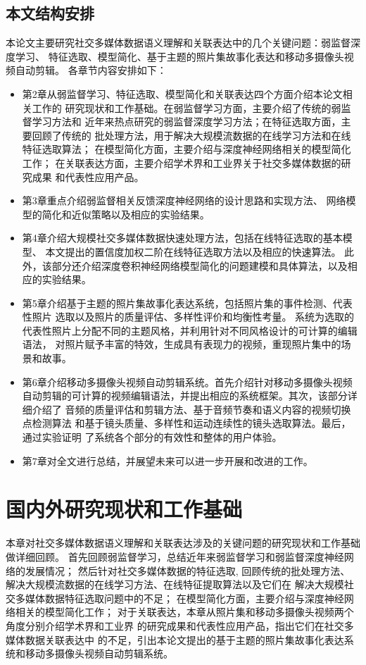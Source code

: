 \documentclass[doctor]{ustcthesis}
\begin{document}
\section{本文结构安排}
本论文主要研究社交多媒体数据语义理解和关联表达中的几个关键问题：弱监督深度学习、
特征选取、模型简化、基于主题的照片集故事化表达和移动多摄像头视频自动剪辑。
各章节内容安排如下：
\begin{itemize}
    \item 第2章从弱监督学习、特征选取、模型简化和关联表达四个方面介绍本论文相关工作的
        研究现状和工作基础。在弱监督学习方面，主要介绍了传统的弱监督学习方法和
        近年来热点研究的弱监督深度学习方法；在特征选取方面，主要回顾了传统的
        批处理方法，用于解决大规模流数据的在线学习方法和在线特征选取算法；
        在模型简化方面，主要介绍与深度神经网络相关的模型简化工作；
        在关联表达方面，主要介绍学术界和工业界关于社交多媒体数据的研究成果
        和代表性应用产品。
    \item 第3章重点介绍弱监督相关反馈深度神经网络的设计思路和实现方法、
        网络模型的简化和近似策略以及相应的实验结果。
    \item 第4章介绍大规模社交多媒体数据快速处理方法，包括在线特征选取的基本模型、
        本文提出的置信度加权二阶在线特征选取方法以及相应的快速算法。
        此外，该部分还介绍深度卷积神经网络模型简化的问题建模和具体算法，以及相应的实验结果。
    \item 第5章介绍基于主题的照片集故事化表达系统，包括照片集的事件检测、代表性照片
        选取以及照片的质量评估、多样性评价和均衡性考量。
        系统为选取的代表性照片上分配不同的主题风格，并利用针对不同风格设计的可计算的编辑语法，
        对照片赋予丰富的特效，生成具有表现力的视频，重现照片集中的场景和故事。
    \item 第6章介绍移动多摄像头视频自动剪辑系统。首先介绍针对移动多摄像头视频
        自动剪辑的可计算的视频编辑语法，并提出相应的系统框架。其次，该部分详细介绍了
        音频的质量评估和剪辑方法、基于音频节奏和语义内容的视频切换点检测算法
        和基于镜头质量、多样性和运动连续性的镜头选取算法。最后，通过实验证明
        了系统各个部分的有效性和整体的用户体验。
    \item 第7章对全文进行总结，并展望未来可以进一步开展和改进的工作。
\end{itemize}


\chapter{国内外研究现状和工作基础}
本章对社交多媒体数据语义理解和关联表达涉及的关键问题的研究现状和工作基础做详细回顾。
首先回顾弱监督学习，总结近年来弱监督学习和弱监督深度神经网络的发展情况；
然后针对社交多媒体数据的特征选取, 回顾传统的批处理方法、
解决大规模流数据的在线学习方法、在线特征提取算法以及它们在
解决大规模社交多媒体数据特征选取问题中的不足；
在模型简化方面，主要介绍与深度神经网络相关的模型简化工作；
对于关联表达，本章从照片集和移动多摄像头视频两个角度分别介绍学术界和工业界
的研究成果和代表性应用产品，指出它们在社交多媒体数据关联表达中
的不足，引出本论文提出的基于主题的照片集故事化表达系统和移动多摄像头视频自动剪辑系统。
\end{document}
